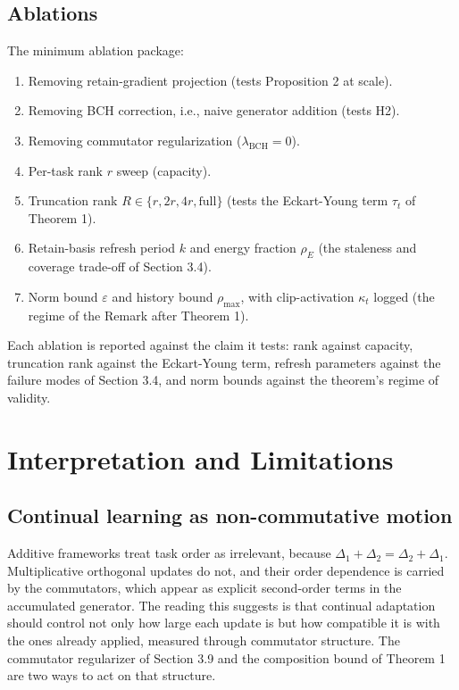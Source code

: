 \documentclass[
]{article}
\providecommand{\tightlist}{%
  \setlength{\itemsep}{0pt}\setlength{\parskip}{0pt}}
\begin{document}
\subsection{Ablations}\label{ablations}

The minimum ablation package:

\begin{enumerate}
\def\labelenumi{\arabic{enumi}.}
\tightlist
\item
  Removing retain-gradient projection (tests Proposition 2 at scale).
\item
  Removing BCH correction, i.e., naive generator addition (tests H2).
\item
  Removing commutator regularization (\(\lambda_{\mathrm{BCH}}=0\)).
\item
  Per-task rank \(r\) sweep (capacity).
\item
  Truncation rank \(R\in\{r,2r,4r,\text{full}\}\) (tests the Eckart-Young term \(\tau_t\) of Theorem 1).
\item
  Retain-basis refresh period \(k\) and energy fraction \(\rho_E\) (the staleness and coverage trade-off of Section 3.4).
\item
  Norm bound \(\varepsilon\) and history bound \(\rho_{\max}\), with clip-activation \(\kappa_t\) logged (the regime of the Remark after Theorem 1).
\end{enumerate}

Each ablation is reported against the claim it tests: rank against capacity, truncation rank against the Eckart-Young term, refresh parameters against the failure modes of Section 3.4, and norm bounds against the theorem's regime of validity.

\section{Interpretation and Limitations}\label{interpretation-and-limitations}

\subsection{Continual learning as non-commutative motion}\label{continual-learning-as-non-commutative-motion}

Additive frameworks treat task order as irrelevant, because \(\Delta_1+\Delta_2=\Delta_2+\Delta_1\). Multiplicative orthogonal updates do not, and their order dependence is carried by the commutators, which appear as explicit second-order terms in the accumulated generator. The reading this suggests is that continual adaptation should control not only how large each update is but how compatible it is with the ones already applied, measured through commutator structure. The commutator regularizer of Section 3.9 and the composition bound of Theorem 1 are two ways to act on that structure.
\end{document}
